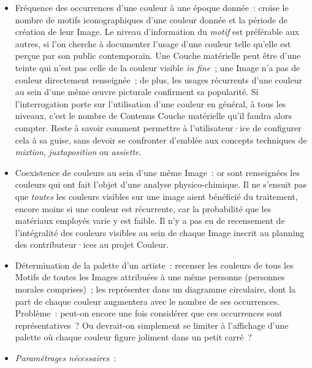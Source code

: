 \documentclass[a4paper,12pt, twoside]{book}
\begin{document}
\normalsize
\begin{itemize}
    \item Fréquence des occurrences d’une couleur à une époque donnée~: croise le nombre de motifs iconographiques d’une couleur donnée et la période de création de leur \textsf{Image}. Le niveau d’information du \textit{motif} est préférable aux autres, si l’on cherche à documenter l’usage d’une couleur telle qu’elle est perçue par son public contemporain. Une Couche matérielle peut être d’une teinte qui n’est pas celle de la couleur visible \textit{in fine}~; une Image n’a pas de couleur directement renseignée~; de plus, les usages récurrents d’une couleur au sein d’une même œuvre picturale confirment sa popularité. Si l’interrogation porte sur l’utilisation d’une couleur en général, à tous les niveaux, c’est le nombre de Contenus \textsf{Couche matérielle} qu’il faudra alors compter. Reste à savoir comment permettre à l’utilisateur·ice de configurer cela à sa guise, sans devoir se confronter d’emblée aux concepts techniques de \textit{mixtion}, \textit{juxtaposition} ou \textit{assiette}.\\

    \item Coexistence de couleurs au sein d’une même \textsf{Image}~: or sont renseignées les couleurs qui ont fait l’objet d’une analyse physico-chimique. Il ne s’ensuit pas que \textit{toutes} les couleurs visibles sur une image aient bénéficié du traitement, encore moins si une couleur est récurrente, car la probabilité que les matériaux employés varie y est faible. Il n’y a pas eu de recensement de l’intégralité des couleurs visibles au sein de chaque Image inscrit au planning des contributeur·ices au projet Couleur.\\

    \item Détermination de la palette d’un artiste~: recenser les couleurs de tous les \textsf{Motifs} de toutes les \textsf{Images} attribuées à une même personne (personnes morales comprises)~; les représenter dans un diagramme circulaire, dont la part de chaque couleur augmentera avec le nombre de ses occurrences. Problème~: peut-on encore une fois considérer que ces occurrences sont représentatives~? Ou devrait-on simplement se limiter à l’affichage d’une palette où chaque couleur figure joliment dans un petit carré~?\\

    \item \textit{Paramétrages nécessaires}~:\\


\end{itemize}
\end{document}
